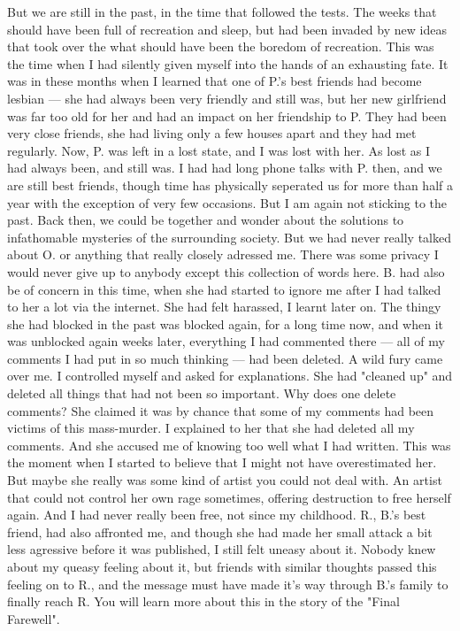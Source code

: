 But we are still in the past, in the time that followed the tests. The weeks that should have been full of recreation and sleep, but had been invaded by new ideas that took over the what should have been the boredom of recreation. This was the time when I had silently given myself into the hands of an exhausting fate. 
It was in these months when I learned that one of P.'s best friends had become lesbian --- she had always been very friendly and still was, but her new girlfriend was far too old for her and had an impact on her friendship to P. They had been very close friends, she had living only a few houses apart and they had met regularly. Now, P. was left in a lost state, and I was lost with her. As lost as I had always been, and still was. 
I had had long phone talks with P. then, and we are still best friends, though time has physically seperated us for more than half a year with the exception of very few occasions. 
But I am again not sticking to the past. Back then, we could be together and wonder about the solutions to infathomable mysteries of the surrounding society. But we had never really talked about O. or anything that really closely adressed me. There was some privacy I would never give up to anybody except this collection of words here. 
B. had also be of concern in this time, when she had started to ignore me after I had talked to her a lot via the internet. She had felt harassed, I learnt later on. The thingy she had blocked in the past was blocked again, for a long time now, and when it was unblocked again weeks later, everything I had commented there --- all of my comments I had put in so much thinking --- had been deleted. 
A wild fury came over me. I controlled myself and asked for explanations. She had "cleaned up" and deleted all things that had not been so important. Why does one delete comments? She claimed it was by chance that some of my comments had been victims of this mass-murder. I explained to her that she had deleted all my comments. And she accused me of knowing too well what I had written. 
This was the moment when I started to believe that I might not have overestimated her. But maybe she really was some kind of artist you could not deal with. An artist that could not control her own rage sometimes, offering destruction to free herself again. 
And I had never really been free, not since my childhood. 
R., B.'s best friend, had also affronted me, and though she had made her small attack a bit less agressive before it was published, I still felt uneasy about it. Nobody knew about my queasy feeling about it, but friends with similar thoughts passed this feeling on to R., and the message must have made it's way through B.'s family to finally reach R. You will learn more about this in the story of the "Final Farewell". 
